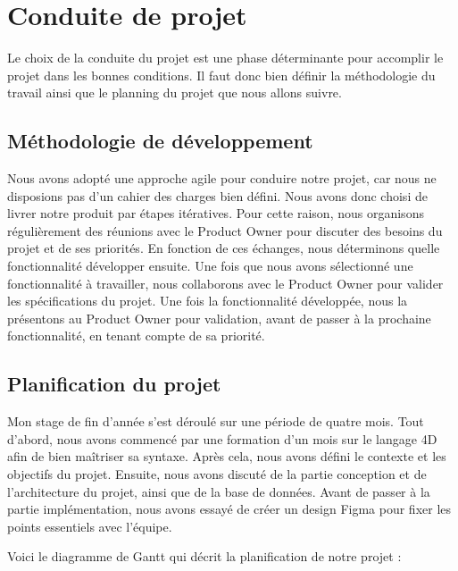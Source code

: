 \section{Conduite de projet}

Le choix de la conduite du projet est une phase déterminante pour accomplir le projet dans les bonnes conditions. Il faut donc bien définir la méthodologie du travail ainsi que le planning du projet que nous allons suivre.

\subsection{Méthodologie de développement}

Nous avons adopté une approche agile pour conduire notre projet, car nous ne disposions pas d'un cahier des charges bien défini. Nous avons donc choisi de livrer notre produit par étapes itératives. Pour cette raison, nous organisons régulièrement des réunions avec le Product Owner pour discuter des besoins du projet et de ses priorités. En fonction de ces échanges, nous déterminons quelle fonctionnalité développer ensuite. Une fois que nous avons sélectionné une fonctionnalité à travailler, nous collaborons avec le Product Owner pour valider les spécifications du projet.
Une fois la fonctionnalité développée, nous la présentons au Product Owner pour validation, avant de passer à la prochaine fonctionnalité, en tenant compte de sa priorité. 


\subsection{Planification du projet}

Mon stage de fin d’année s'est déroulé sur une période de quatre mois. Tout d’abord, nous avons commencé par une formation d’un mois sur le langage 4D afin de bien maîtriser sa syntaxe. Après cela, nous avons défini le contexte et les objectifs du projet. Ensuite, nous avons discuté de la partie conception et de l'architecture du projet, ainsi que de la base de données. Avant de passer à la partie implémentation, nous avons essayé de créer un design Figma pour fixer les points essentiels avec l’équipe. 

Voici le diagramme de Gantt qui décrit la planification de notre projet :


